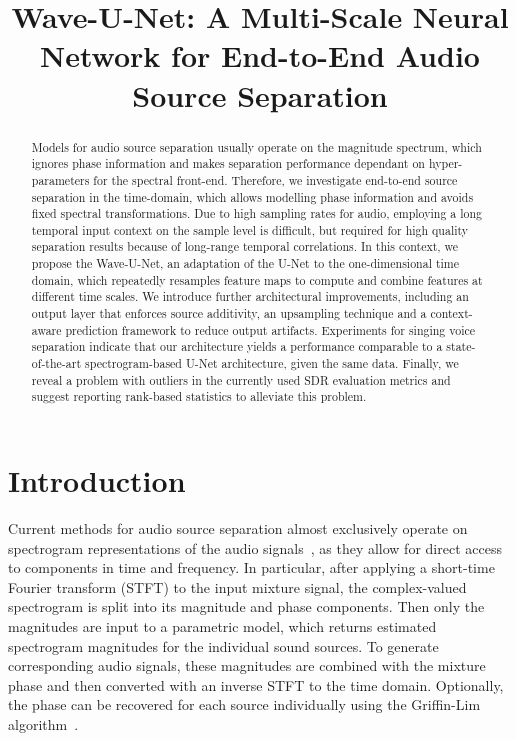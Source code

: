 \documentclass{article}
\title{Wave-U-Net: A Multi-Scale Neural Network for End-to-End Audio Source Separation}
\begin{document}
\maketitle

\renewcommand{\baselinestretch}{0.97}
\selectfont

\begin{abstract}
Models for audio source separation usually operate on the magnitude spectrum, which ignores phase information and makes separation performance dependant on hyper-parameters for the spectral front-end.
Therefore, we investigate end-to-end source separation in the time-domain, which allows modelling phase information and avoids fixed spectral transformations.
Due to high sampling rates for audio, employing a long temporal input context on the sample level is difficult, but required for high quality separation results because of long-range temporal correlations.
In this context, we propose the Wave-U-Net, an adaptation of the U-Net to the one-dimensional time domain, which repeatedly resamples feature maps to compute and combine features at different time scales.
We introduce further architectural improvements, including an output layer that enforces source additivity, an upsampling technique and a context-aware prediction framework to reduce output artifacts.
Experiments for singing voice separation indicate that our architecture yields a performance comparable to a state-of-the-art spectrogram-based U-Net architecture, given the same data.
Finally, we reveal a problem with outliers in the currently used SDR evaluation metrics and suggest reporting rank-based statistics to alleviate this problem.
\end{abstract}

\section{Introduction}
\label{sec:intro}

Current methods for audio source separation almost exclusively operate on spectrogram representations of the audio signals~\cite{Huang2014,Jansson2017}, as they allow for direct access to components in time and frequency.
In particular, after applying a short-time Fourier transform (STFT) to the input mixture signal, the complex-valued spectrogram is split into its magnitude and phase components.
Then only the magnitudes are input to a parametric model, which returns estimated spectrogram magnitudes for the individual sound sources.
To generate corresponding audio signals, these magnitudes are combined with the mixture phase and then converted with an inverse STFT to the time domain.
Optionally, the phase can be recovered for each source individually using the Griffin-Lim algorithm~\cite{Griffin1984}.
\end{document}
